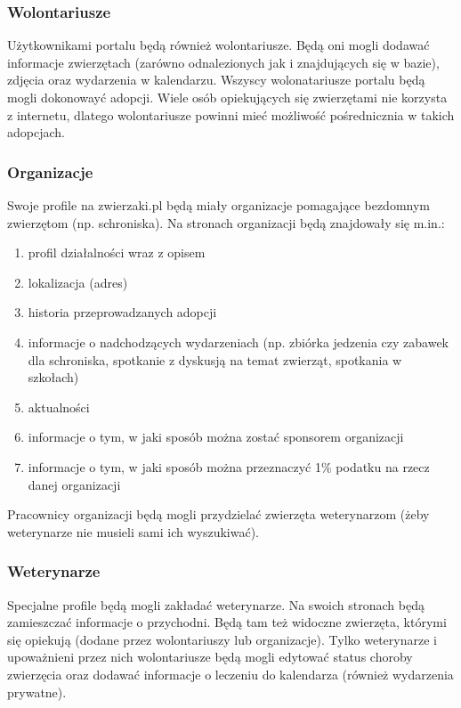 \documentclass[10pt,a4paper]{article}
\begin{document}
\subsubsection{Wolontariusze}
Użytkownikami portalu będą również wolontariusze. Będą oni mogli dodawać informacje zwierzętach (zarówno odnalezionych jak i znajdujących się w bazie), zdjęcia oraz wydarzenia w kalendarzu. Wszyscy wolonatariusze portalu będą mogli dokonowayć adopcji. Wiele osób opiekujących się zwierzętami nie korzysta z internetu, dlatego wolontariusze powinni mieć możliwość pośrednicznia w takich adopcjach.
 
\subsubsection{Organizacje}
Swoje profile na zwierzaki.pl będą miały organizacje pomagające bezdomnym zwierzętom (np. schroniska). Na stronach organizacji będą znajdowały się m.in.:
\begin{enumerate}
	\item profil działalności wraz z opisem
	\item lokalizacja (adres)
	\item historia przeprowadzanych adopcji
	\item informacje o nadchodzących wydarzeniach (np. zbiórka jedzenia czy zabawek dla schroniska, spotkanie z dyskusją na temat zwierząt, spotkania w szkołach)
	\item aktualności
	\item informacje o tym, w jaki sposób można zostać sponsorem organizacji
	\item informacje o tym, w jaki sposób można przeznaczyć 1\% podatku na rzecz danej organizacji
\end{enumerate}

Pracownicy organizacji będą mogli przydzielać zwierzęta weterynarzom (żeby weterynarze nie musieli sami ich wyszukiwać).
 
\subsubsection{Weterynarze}
Specjalne profile będą mogli zakładać weterynarze. Na swoich stronach będą zamieszczać informacje o przychodni. Będą tam też widoczne zwierzęta, którymi się opiekują (dodane przez wolontariuszy lub organizacje). Tylko weterynarze i upoważnieni przez nich wolontariusze będą mogli edytować status choroby zwierzęcia oraz dodawać informacje o leczeniu do kalendarza (również wydarzenia prywatne).
\end{document}
